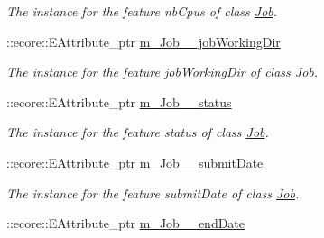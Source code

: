 \begin{DoxyCompactItemize}
\begin{DoxyCompactList}\small\item\em The instance for the feature nbCpus of class \hyperlink{classTMS__Data_1_1Job}{Job}. \item\end{DoxyCompactList}\item 
\hypertarget{classTMS__Data_1_1TMS__DataPackage_a467d1a82b5c3f37a3feba00445121a0b}{
::ecore::EAttribute\_\-ptr \hyperlink{classTMS__Data_1_1TMS__DataPackage_a467d1a82b5c3f37a3feba00445121a0b}{m\_\-Job\_\-\_\-jobWorkingDir}}
\label{classTMS__Data_1_1TMS__DataPackage_a467d1a82b5c3f37a3feba00445121a0b}

\begin{DoxyCompactList}\small\item\em The instance for the feature jobWorkingDir of class \hyperlink{classTMS__Data_1_1Job}{Job}. \item\end{DoxyCompactList}\item 
\hypertarget{classTMS__Data_1_1TMS__DataPackage_a68d4858ecf630668aa756aa8909f561d}{
::ecore::EAttribute\_\-ptr \hyperlink{classTMS__Data_1_1TMS__DataPackage_a68d4858ecf630668aa756aa8909f561d}{m\_\-Job\_\-\_\-status}}
\label{classTMS__Data_1_1TMS__DataPackage_a68d4858ecf630668aa756aa8909f561d}

\begin{DoxyCompactList}\small\item\em The instance for the feature status of class \hyperlink{classTMS__Data_1_1Job}{Job}. \item\end{DoxyCompactList}\item 
\hypertarget{classTMS__Data_1_1TMS__DataPackage_a2fd355451e2895f4692b2b36accf3164}{
::ecore::EAttribute\_\-ptr \hyperlink{classTMS__Data_1_1TMS__DataPackage_a2fd355451e2895f4692b2b36accf3164}{m\_\-Job\_\-\_\-submitDate}}
\label{classTMS__Data_1_1TMS__DataPackage_a2fd355451e2895f4692b2b36accf3164}

\begin{DoxyCompactList}\small\item\em The instance for the feature submitDate of class \hyperlink{classTMS__Data_1_1Job}{Job}. \item\end{DoxyCompactList}\item 
\hypertarget{classTMS__Data_1_1TMS__DataPackage_aaf00a93399d9fc9c7a56f1f3cdbac348}{
::ecore::EAttribute\_\-ptr \hyperlink{classTMS__Data_1_1TMS__DataPackage_aaf00a93399d9fc9c7a56f1f3cdbac348}{m\_\-Job\_\-\_\-endDate}}
\label{classTMS__Data_1_1TMS__DataPackage_aaf00a93399d9fc9c7a56f1f3cdbac348}


\end{DoxyCompactItemize}
